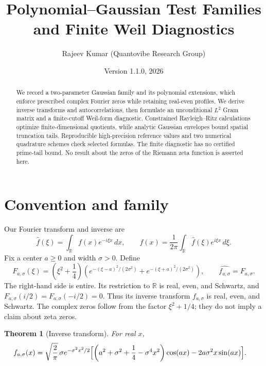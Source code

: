 \documentclass[11pt]{article}
\title{Polynomial--Gaussian Test Families and Finite Weil Diagnostics}
\author{Rajeev Kumar (Quantovibe Research Group)}
\date{Version 1.1.0, 2026}
\newtheorem{theorem}{Theorem}
\newcommand{\R}{\mathbb{R}}
\begin{document}
\maketitle

\begin{abstract}
We record a two-parameter Gaussian family and its polynomial extensions,
which enforce prescribed complex Fourier zeros while retaining real-even
profiles. We derive inverse transforms and autocorrelations, then formulate
an unconditional $L^2$ Gram matrix and a finite-cutoff Weil-form diagnostic.
Constrained Rayleigh--Ritz calculations optimize finite-dimensional
quotients, while analytic Gaussian envelopes bound spatial truncation
tails. Reproducible high-precision reference values and two numerical
quadrature schemes check selected formulas. The finite diagnostic has no
certified prime-tail bound. No result about the zeros of the Riemann zeta
function is asserted here.
\end{abstract}

\section{Convention and family}

Our Fourier transform and inverse are
\begin{equation}\label{eq:convention}
  \widehat{f}(\xi)=\int_{\R} f(x)e^{-i\xi x}\,dx,
  \qquad
  f(x)=\frac{1}{2\pi}\int_{\R}\widehat{f}(\xi)e^{i\xi x}\,d\xi.
\end{equation}
Fix a center $a\geq 0$ and width $\sigma>0$. Define
\begin{equation}\label{eq:profile}
  F_{a,\sigma}(\xi)
  =\left(\xi^2+\frac14\right)
    \left(e^{-(\xi-a)^2/(2\sigma^2)}
         +e^{-(\xi+a)^2/(2\sigma^2)}\right),
  \qquad \widehat{f_{a,\sigma}}=F_{a,\sigma}.
\end{equation}
The right-hand side is entire. Its restriction to $\R$ is real, even, and
Schwartz, and $F_{a,\sigma}(i/2)=F_{a,\sigma}(-i/2)=0$. Thus its inverse
transform $f_{a,\sigma}$ is real, even, and Schwartz. The complex zeros
follow from the factor $\xi^2+1/4$; they do not imply a claim about zeta
zeros.

\begin{theorem}[Inverse transform]\label{thm:inverse}
For real $x$,
\begin{align}\label{eq:inverse}
f_{a,\sigma}(x)
={}&\sqrt{\frac{2}{\pi}}\,\sigma e^{-\sigma^2x^2/2}
\Bigl[
  \left(a^2+\sigma^2+\frac14-\sigma^4x^2\right)\cos(ax)
  -2a\sigma^2x\sin(ax)
\Bigr].
\end{align}
\end{theorem}
\end{document}
